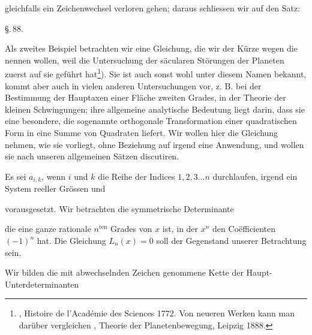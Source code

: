 gleichfalls ein Zeichenwechsel verloren gehen; daraus schliessen wir auf den Satz:


\begin{center}
\S.\,88.

\end{center}

Als zweites Beispiel betrachten wir eine Gleichung, die wir der Kürze wegen die  nennen wollen, weil die Untersuchung der säcularen Störungen der Planeten zuerst auf sie geführt hat\footnote{, Histoire de l'Acad\'emie des Sciences 1772. Von neueren Werken kann man dar\"uber vergleichen , Theorie der Planetenbewegung, Leipzig 1888.}). Sie ist auch sonst wohl unter diesem Namen bekannt, kommt aber auch in vielen anderen Untersuchungen vor, z. B. bei der Bestimmung der Hauptaxen einer Fläche zweiten Grades, in der Theorie der kleinen Schwingungen; ihre allgemeine analytische Bedeutung liegt darin, dass sie eine besondere, die sogenannte orthogonale Transformation einer quadratischen Form in eine Summe von Quadraten liefert. Wir wollen hier die Gleichung nehmen, wie sie vorliegt, ohne Beziehung auf irgend eine Anwendung, und wollen sie nach unseren allgemeinen Sätzen discutiren.

Es sei $a_{i,k}$, wenn $i$ und $k$ die Reihe der Indices $1, 2, 3 \ldots n$ durchlaufen, irgend ein System reeller Grössen und


vorausgesetzt. Wir betrachten die symmetrische Determinante


die eine ganze rationale  $n^{\text{ten}}$ Grades von $x$ ist, in der $x^n$ den Co\"efficienten $(-1)^n$ hat. Die Gleichung $L_n(x)=0$ soll der Gegenstand unserer Betrachtung sein.

Wir bilden die mit abwechselnden Zeichen genommene Kette der Haupt-Unterdeterminanten

